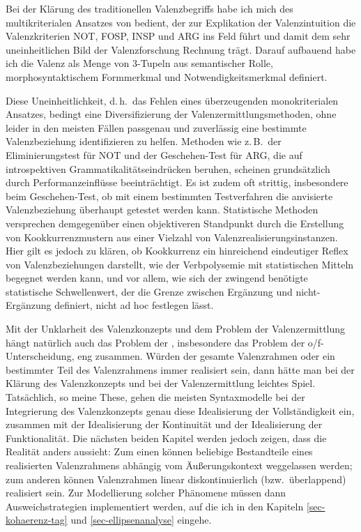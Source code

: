 Bei der Klärung des traditionellen Valenzbegriffs habe ich mich des multikriterialen Ansatzes von \cite{Jacobs:94} bedient, der zur Explikation der Valenzintuition die Valenzkriterien NOT, FOSP, INSP und ARG ins Feld führt und damit dem sehr uneinheitlichen Bild der Valenzforschung Rechnung trägt. Darauf aufbauend habe ich die Valenz als Menge von 3-Tupeln aus semantischer Rolle, morphosyntaktischem Formmerkmal und Notwendigkeitsmerkmal definiert.  

Diese Uneinheitlichkeit, d.\,h.\ das Fehlen eines überzeugenden monokriterialen Ansatzes, bedingt eine Diversifizierung der Valenzermittlungsmethoden, ohne leider in den meisten Fällen passgenau und zuverlässig eine bestimmte Valenzbeziehung identifizieren zu helfen. Methoden wie z.\,B.\ der Eliminierungstest für NOT und der Geschehen-Test für ARG, die auf introspektiven Grammatikalitätseindrücken beruhen, scheinen grundsätzlich durch Performanzeinflüsse beeinträchtigt. Es ist zudem oft strittig, insbesondere beim Geschehen-Test, ob mit einem bestimmten Testverfahren die anvisierte Valenzbeziehung überhaupt getestet werden kann. Statistische Methoden  versprechen demgegenüber einen objektiveren Standpunkt durch die Erstellung von Kookkurrenzmustern aus einer Vielzahl von Valenzrealisierungsinstanzen. Hier gilt es jedoch zu klären, ob Kookkurrenz ein hinreichend eindeutiger Reflex von Valenzbeziehungen darstellt, wie der Verbpolysemie mit statistischen Mitteln begegnet werden kann, und vor allem, wie sich der zwingend benötigte statistische Schwellenwert, der die Grenze zwischen Ergänzung und nicht-Ergänzung definiert, nicht ad hoc festlegen lässt.

Mit der Unklarheit des Valenzkonzepts und dem Problem der Valenzermittlung hängt natürlich auch das Problem der , insbesondere das Problem der o/f-Unterschei\-dung, eng zusammen. Würden der gesamte Valenzrahmen oder ein bestimmter Teil des Valenzrahmens immer realisiert sein, dann hätte man bei der Klärung des Valenzkonzepts und bei der Valenzermittlung leichtes Spiel. Tatsächlich, so meine These, gehen die meisten Syntaxmodelle bei der Integrierung des Valenzkonzepts genau diese Idealisierung der Vollständigkeit ein, zusammen mit der Idealisierung der Kontinuität und der Idealisierung der Funktionalität. Die nächsten beiden Kapitel werden jedoch zeigen, dass die Realität anders aussieht: Zum einen können beliebige Bestandteile eines realisierten Valenzrahmens abhängig vom Äu\ss erungskontext weggelassen werden; zum anderen können Valenzrahmen linear diskontinuierlich (bzw.\ überlappend) realisiert sein. Zur Modellierung solcher Phänomene müssen dann Ausweichstrategien implementiert werden, auf die ich in den Kapiteln \ref{sec-kohaerenz-tag} und \ref{sec-ellipsenanalyse} eingehe. 

